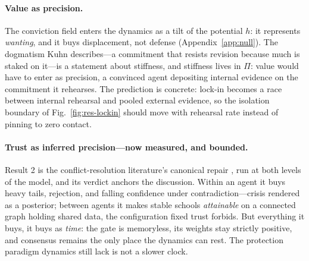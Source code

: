 \documentclass[runningheads]{llncs}
\begin{document}
\paragraph{Value as precision.}
The conviction field enters the dynamics as a tilt of the potential $h$: it represents
\emph{wanting}, and it buys displacement, not defense (Appendix~\ref{app:null}). The dogmatism
Kuhn describes---a commitment that resists revision because much is staked on it---is a statement
about stiffness, and stiffness lives in $\Pi$: value would have to enter as precision, a
convinced agent depositing internal evidence on the commitment it rehearses. The prediction is
concrete: lock-in becomes a race between internal rehearsal and pooled external evidence, so the
isolation boundary of Fig.~\ref{fig:res-lockin} should move with rehearsal rate instead of
pinning to zero contact.

\paragraph{Trust as inferred precision---now measured, and bounded.}
Result 2 is the conflict-resolution literature's canonical repair \citep{ohagan2012}, run at
both levels of the model, and its verdict anchors the discussion. Within an agent it buys heavy
tails, rejection, and falling confidence under contradiction---crisis rendered as a posterior;
between agents it makes stable schools \emph{attainable} on a connected graph holding shared
data, the configuration fixed trust forbids. But everything it buys, it buys as \emph{time}:
the gate is memoryless, its weights stay strictly positive, and consensus remains the only
place the dynamics can rest. The protection paradigm dynamics still lack is not a slower clock.
\end{document}
